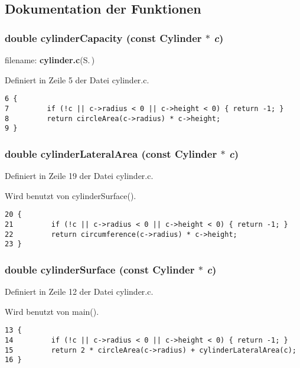 \subsection{Dokumentation der Funktionen}
\subsubsection{\setlength{\rightskip}{0pt plus 5cm}double cylinder\-Capacity (const {\bf Cylinder} $\ast$ {\em c})}\label{build_2inc_2cylinder_8h_c35ebde26ddb19866e3f1259e304cca8}


filename: {\bf cylinder.c}{\rm (S.\,\pageref{cylinder_8c})} 

Definiert in Zeile 5 der Datei cylinder.c.

\footnotesize\begin{verbatim}6 {
7         if (!c || c->radius < 0 || c->height < 0) { return -1; }
8         return circleArea(c->radius) * c->height;
9 }
\end{verbatim}\normalsize 


\subsubsection{\setlength{\rightskip}{0pt plus 5cm}double cylinder\-Lateral\-Area (const {\bf Cylinder} $\ast$ {\em c})}\label{build_2inc_2cylinder_8h_bea49511e550ad0db24bf68ce91418ff}




Definiert in Zeile 19 der Datei cylinder.c.

Wird benutzt von cylinder\-Surface().

\footnotesize\begin{verbatim}20 {
21         if (!c || c->radius < 0 || c->height < 0) { return -1; }
22         return circumference(c->radius) * c->height;
23 }
\end{verbatim}\normalsize 


\subsubsection{\setlength{\rightskip}{0pt plus 5cm}double cylinder\-Surface (const {\bf Cylinder} $\ast$ {\em c})}\label{build_2inc_2cylinder_8h_064d77300d0537b11e9d104340f2f959}




Definiert in Zeile 12 der Datei cylinder.c.

Wird benutzt von main().

\footnotesize\begin{verbatim}13 {
14         if (!c || c->radius < 0 || c->height < 0) { return -1; }
15         return 2 * circleArea(c->radius) + cylinderLateralArea(c);
16 }
\end{verbatim}\normalsize 


